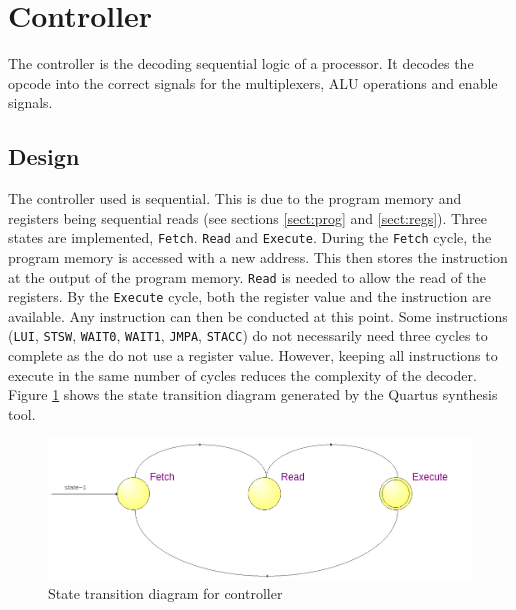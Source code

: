 

\section{Controller}\label{sect:controller}

The controller is the decoding sequential logic of a processor. 
It decodes the opcode into the correct signals for the multiplexers, ALU operations and enable signals.


\subsection{Design}

The controller used is sequential. 
This is due to the program memory and registers being sequential reads (see sections \ref{sect:prog} and \ref{sect:regs}).
Three states are implemented, \texttt{Fetch}. \texttt{Read} and \texttt{Execute}. 
During the \texttt{Fetch} cycle, the program memory is accessed with a new address. 
This then stores the instruction at the output of the program memory. 
\texttt{Read} is needed to allow the read of the registers. 
By the \texttt{Execute} cycle, both the register value and the instruction are available. 
Any instruction can then be conducted at this point.
Some instructions (\texttt{LUI}, \texttt{STSW}, \texttt{WAIT0}, \texttt{WAIT1}, \texttt{JMPA}, \texttt{STACC}) do not necessarily need three cycles to complete as the do not use a register value.
However, keeping all instructions to execute in the same number of cycles reduces the complexity of the decoder. 
Figure \ref{fig:controllerasm} shows the state transition diagram generated by the Quartus synthesis tool.

\begin{figure}
\includegraphics[width=\textwidth]{Figures/cpu_control_state.png}
\caption{State transition diagram for controller}
\label{fig:controllerasm}
\end{figure}

